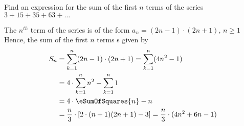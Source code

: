 
%
%
%
%
% 
% 

\question Find an expression for the sum of the first $n$ terms of the series 
$ 3 + 15 + 35 + 63 + \ldots $
\insertQR{}

\ifprintanswers
\fi 

\begin{solution}
	The $n^{th}$ term of the series is of the form $a_n = (2n-1)\cdot(2n+1),\, n \geq 1$
	Hence, the sum of the first $n$ terms s given by
	\begin{align}
		S_n &= \sum_{k=1}^{n}(2n-1)\cdot(2n+1) = \sum_{k=1}^{n}(4n^2-1) \\
		&= 4\cdot\sum_{k=1}^{n}n^2 - \sum_{k=1}^{n}1 \\
		&= 4\cdot\eSumOfSquares{n} - n \\
		&= \dfrac{n}{3}\cdot\left[ 2\cdot(n+1)(2n+1) - 3\right] = \dfrac{n}{3}\cdot(4n^2+6n-1)
	\end{align}
\end{solution}
